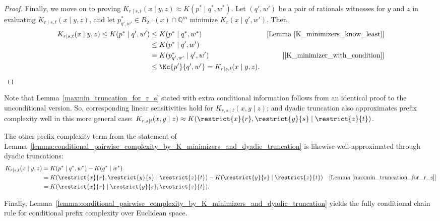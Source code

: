 \begin{proof}
    Finally, we move on to proving $K_{r \mid s, t}(x \mid y, z) \approx K(p^* \mid q^*, w^*)$. Let $(q', w')$ be a pair of rationals witnesses for $y$ and $z$ in evaluating $K_{r \mid s, t}(x \mid y, z)$, and let $p^*_{q', w'} \in B_{2^{-r}}(x) \cap \mathbb{Q}^m$ minimize $K_{r}(x \mid q', w')$. Then, 
    \begin{align*}
        K_{r \mid s, t}(x \mid y, z) \leq K(p^* \mid q', w') &\leq K(p^* \mid q^*, w^*) & [\text{Lemma~\ref{K_minimizers_know_least}}]\\
        &\leq K(p^* \mid q', w')\\
        &= K(p^*_{q', w'} \mid q', w')& [\text{\eqref{K_minimizer_with_condition}}]\\
        &\leq \Kc{p'}{q', w'} = K_{r \mid s, t}(x \mid y, z).
    \end{align*}
\end{proof}

Note that Lemma~\ref{maxmin_truncation_for_r_s} stated with extra conditional information follows from an identical proof to the unconditional version. So, corresponding linear sensitivities hold for $K_{r, s \mid t}(x, y \mid z)$; and dyadic truncation also approximates prefix complexity well in this more general case: $K_{r, s \mid t}(x, y \mid z) \approx K(\restrict{x}{r}, \restrict{y}{s} \mid \restrict{z}{t})$.

The other prefix complexity term from the statement of Lemma~\ref{lemma:conditional_pairwise_complexity_by_K_minimizers_and_dyadic_truncation} is likewise well-approximated through dyadic truncations:
\begin{align*}
    K_{r \mid s, t}(x \mid y, z) &= K(p^* \mid q^*, w^*) - K(q^* \mid w^*)\\
    &= K(\restrict{x}{r}, \restrict{y}{s} \mid \restrict{z}{t}) - K(\restrict{y}{s} \mid \restrict{z}{t}) & [\text{Lemma~\ref{maxmin_truncation_for_r_s}}]\\
    &= K(\restrict{x}{r} \mid \restrict{y}{s}, \restrict{z}{t}).
\end{align*}

Finally, Lemma~\ref{lemma:conditional_pairwise_complexity_by_K_minimizers_and_dyadic_truncation} yields the fully conditional chain rule for conditional prefix complexity over Euclidean space.

